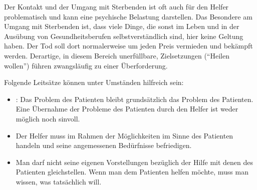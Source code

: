 {Der Kontakt und der Umgang mit Sterbenden ist oft auch für
den Helfer problematisch und kann eine psychische Belastung
darstellen. Das Besondere am Umgang mit
Sterbenden ist, dass viele Dinge, die sonst im Leben und in
der Ausübung von Gesundheitsberufen selbstverständlich sind,
hier keine Geltung haben. Der Tod soll dort normalerweise um
jeden Preis vermieden und bekämpft werden. Derartige, in
diesem Bereich unerfüllbare, Zielsetzungen (\enquote{Heilen
wollen}) führen zwangsläufig zu einer Überforderung.

Folgende Leitsätze können unter Umständen hilfreich sein:

\begin{itemize}
  \item {}: Das Problem des
  Patienten bleibt grundsätzlich das Problem des Patienten. 
  Eine Übernahme der Probleme des Patienten durch den 
  Helfer ist weder möglich noch sinvoll. 
  \item Der Helfer muss im Rahmen der Möglichkeiten im Sinne
  des Patienten handeln und seine angemessenen
  Bedürfnisse befriedigen.
\item Man darf nicht seine eigenen Vorstellungen
  bezüglich der Hilfe mit denen des Patienten
  gleichstellen. Wenn man dem Patienten helfen möchte, muss
  man wissen, was  tatsächlich will.
\end{itemize}
}
{}
{}
{}
{}

\begin{Synopsis}
\end{Synopsis}






















